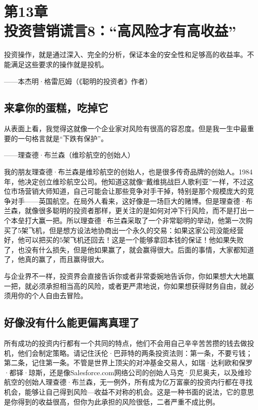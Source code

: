 
\section[第13章\q 投资营销谎言8：“高风险才有高收益”]{第13章\\ 投资营销谎言8：“高风险才有高收益”}

\begin{BookQuote}
投资操作，就是通过深入、完全的分析，保证本金的安全性和足够高的收益率。不能满足这些要求的操作就是投机。

\hfill ——本杰明·格雷厄姆（《聪明的投资者》作者）
\end{BookQuote}

\subsection{来拿你的蛋糕，吃掉它}

\begin{BookQuote}
从表面上看，我觉得这就像一个企业家对风险有很高的容忍度。但是我一生中最重要的一句格言就是“下跌有保护”。

\hfill ——理查德·布兰森（维珍航空的创始人）
\end{BookQuote}

我的朋友理查德·布兰森是维珍航空的创始人，也是很多传奇品牌的创始人。1984年，他决定创立维珍航空公司。他知道这就像“戴维挑战巨人歌利亚”一样，不过这位市场营销大师知道，自己可能会让那些竞争对手干掉，特别是那个规模庞大的竞争对手——英国航空。在局外人看来，这好像是一场巨大的赌博。但是理查德·布兰森，就像很多聪明的投资者那样，更关注的是如何对冲下行风险，而不是打出一个本垒打大赢一把。所以理查德·布兰森采取了一个非常聪明的举动，他第一次购买了5架飞机，但是想方设法地协商出一个永久的交易：如果这家公司没能经营好，他可以把买的5架飞机还回去！这是一个能够拿回本钱的保证！他如果失败了，也没有什么损失，但是他如果赢了，就会赢得很大。后面的事情，大家都知道了，他真的赢了，而且赢得很大。

与企业界不一样，投资界会直接告诉你或者非常委婉地告诉你，你如果想大大地赢一把，就必须承担相当高的风险，或者更严肃地说，你如果想获得财务自由，就必须用你的个人自由去冒险。

\subsection{好像没有什么能更偏离真理了}

所有成功的投资内行都有一个共同的特点，他们不会用自己辛辛苦苦攒的钱去做投机，他们会制定策略。请记住沃伦·巴菲特的两条投资法则：第一条，不要亏钱；第二条，记住第一条。不管是世界上顶尖的对冲基金交易人，如瑞·达利欧和保罗·都铎·琼斯，还是像Salesforce.com网络公司的创始人马克·贝尼奥夫，以及维珍航空的创始人理查德·布兰森，无一例外，所有成为亿万富豪的投资内行都在寻找机会，能够让自己得到风险—收益不对称的机会。这是一种书面的说法，它的意思是你得到的收益很高，但你为此承担的风险很低，二者严重不成比例。

